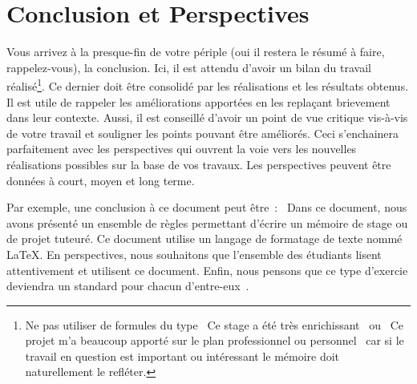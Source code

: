 \documentclass[a4paper, 12pt]{book}
\begin{document}
\chapter{Conclusion et Perspectives\label{chap-conclusion}}
Vous arrivez à la presque-fin de votre périple (oui il restera le
résumé à faire, rappelez-vous), la conclusion. Ici, il est attendu
d'avoir un bilan du travail réalisé\footnote{Ne pas utiliser de
  formules du type \guillemotleft{}~Ce stage a été très
  enrichissant~\guillemotright{} ou \guillemotleft{}~Ce projet m'a
  beaucoup apporté sur le plan professionnel ou
  personnel~\guillemotright{} car si le travail en question est
  important ou intéressant le mémoire doit naturellement le
  refléter.}. Ce dernier doit être consolidé par les réalisations et
les résultats obtenus. Il est utile de rappeler les améliorations
apportées en les replaçant brievement dans leur contexte. Aussi, il est
conseillé d'avoir un point de vue critique vis-à-vis de votre travail
et souligner les points pouvant être améliorés. Ceci s'enchainera
parfaitement avec les perspectives qui ouvrent la voie vers les
nouvelles réalisations possibles sur la base de vos travaux. Les
perspectives peuvent être données à court, moyen et long terme.



Par exemple, une conclusion à ce document peut être~:
\guillemotleft{}~Dans ce document, nous avons présenté un ensemble de
règles permettant d'écrire un mémoire de stage ou de projet
tuteuré. Ce document utilise un langage de formatage de texte nommé
\LaTeX. En perspectives, nous souhaitons que l'ensemble des étudiants
lisent attentivement et utilisent ce document. Enfin, nous pensons que
ce type d'exercie deviendra un standard pour chacun
d'entre-eux~\guillemotright.



\end{document}
